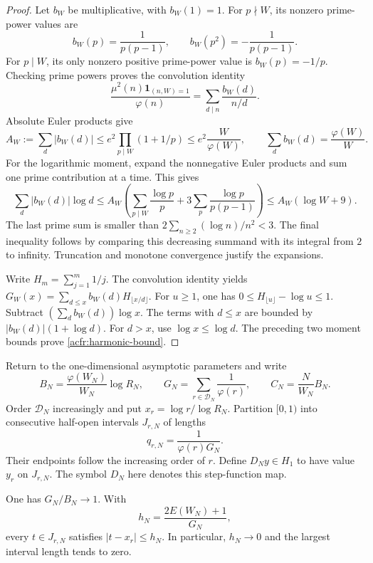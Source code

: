 \begin{proof}
Let $b_W$ be multiplicative, with $b_W(1)=1$.
For $p\nmid W$, its nonzero prime-power values are
\[
 b_W(p)=\frac1{p(p-1)},\qquad b_W(p^2)=-\frac1{p(p-1)}.
\]
For $p\mid W$, its only nonzero positive prime-power value is
$b_W(p)=-1/p$.
Checking prime powers proves the convolution identity
\[
 \frac{\mu^2(n)\mathbf1_{(n,W)=1}}{\varphi(n)}
       =\sum_{d\mid n}\frac{b_W(d)}{n/d}.
\]
Absolute Euler products give
\[
 A_W:=\sum_d|b_W(d)|
 \leq e^2\prod_{p\mid W}(1+1/p)
 \leq e^2\frac W{\varphi(W)},\qquad
 \sum_d b_W(d)=\frac{\varphi(W)}W.
\]
For the logarithmic moment, expand the nonnegative Euler products and
sum one prime contribution at a time.  This gives
\[
 \sum_d|b_W(d)|\log d
 \leq A_W\left(\sum_{p\mid W}\frac{\log p}{p}
          +3\sum_p\frac{\log p}{p(p-1)}\right)
 \leq A_W(\log W+9).
\]
The last prime sum is smaller than
$2\sum_{n\geq2}(\log n)/n^2<3$.
The final inequality follows by comparing this decreasing summand with
its integral from $2$ to infinity.
Truncation and monotone convergence justify the expansions.

Write $H_m=\sum_{j=1}^m1/j$.
The convolution identity yields
$G_W(x)=\sum_{d\leq x}b_W(d)H_{\lfloor x/d\rfloor}$.
For $u\geq1$, one has $0\leq H_{\lfloor u\rfloor}-\log u\leq1$.
Subtract $(\sum_db_W(d))\log x$.
The terms with $d\leq x$ are bounded by $|b_W(d)|(1+\log d)$.
For $d>x$, use $\log x\leq\log d$.
The preceding two moment bounds prove \eqref{acfr:harmonic-bound}.
\end{proof}

Return to the one-dimensional asymptotic parameters and write
\[
 B_N=\frac{\varphi(W_N)}{W_N}\log R_N,\qquad
 G_N=\sum_{r\in\mathcal D_N}\frac1{\varphi(r)},\qquad
 C_N=\frac N{W_N}B_N.
\]
Order $\mathcal D_N$ increasingly and put $x_r=\log r/\log R_N$.
Partition $[0,1)$ into consecutive half-open intervals $J_{r,N}$ of lengths
\[
 q_{r,N}=\frac1{\varphi(r)G_N}.
\]
Their endpoints follow the increasing order of $r$.
Define $D_Ny\in H_1$ to have value $y_r$ on $J_{r,N}$.
The symbol $D_N$ here denotes this step-function map.

\begin{lemma}\label{acfr:cells}
One has $G_N/B_N\to1$.
With
\[
 h_N=\frac{2E(W_N)+1}{G_N},
\]
every $t\in J_{r,N}$ satisfies $|t-x_r|\leq h_N$.
In particular, $h_N\to0$ and the largest interval length tends to zero.
\end{lemma}


